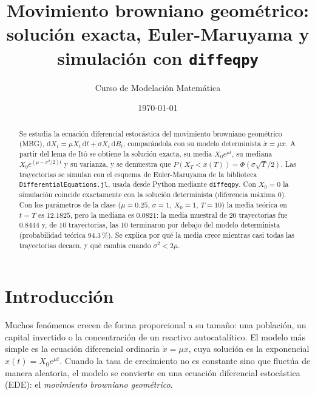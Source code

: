 \documentclass[11pt,a4paper]{article}
\title{\textbf{Movimiento browniano geométrico:\\solución exacta, Euler-Maruyama y simulación con \texttt{diffeqpy}}}
\author{Curso de Modelación Matemática}
\date{\today}
\newcommand{\dd}{\mathrm{d}}
\begin{document}
\maketitle

\begin{abstract}
\noindent
Se estudia la ecuación diferencial estocástica del movimiento browniano geométrico (MBG), $\dd X_t = \mu X_t\,\dd t + \sigma X_t\,\dd B_t$, comparándola con su modelo determinista $\dot x = \mu x$. A partir del lema de Itô se obtiene la solución exacta, su media $X_0e^{\mu t}$, su mediana $X_0e^{(\mu-\sigma^2/2)t}$ y su varianza, y se demuestra que $P(X_T < x(T)) = \Phi(\sigma\sqrt{T}/2)$. Las trayectorias se simulan con el esquema de Euler-Maruyama de la biblioteca \texttt{DifferentialEquations.jl}, usada desde Python mediante \texttt{diffeqpy}. Con $X_0 = 0$ la simulación coincide exactamente con la solución determinista (diferencia máxima $0$). Con los parámetros de la clase ($\mu = 0.25$, $\sigma = 1$, $X_0 = 1$, $T = 10$) la media teórica en $t = T$ es $12.1825$, pero la mediana es $0.0821$: la media muestral de 20 trayectorias fue $0.8444$ y, de 10 trayectorias, las 10 terminaron por debajo del modelo determinista (probabilidad teórica 94.3\,\%). Se explica por qué la media crece mientras casi todas las trayectorias decaen, y qué cambia cuando $\sigma^2 < 2\mu$.
\end{abstract}

\tableofcontents
\newpage

\section{Introducción}

Muchos fenómenos crecen de forma proporcional a su tamaño: una población, un capital invertido o la concentración de un reactivo autocatalítico. El modelo más simple es la ecuación diferencial ordinaria $\dot x = \mu x$, cuya solución es la exponencial $x(t) = X_0 e^{\mu t}$. Cuando la tasa de crecimiento no es constante sino que fluctúa de manera aleatoria, el modelo se convierte en una ecuación diferencial estocástica (EDE): el \emph{movimiento browniano geométrico}.
\end{document}
